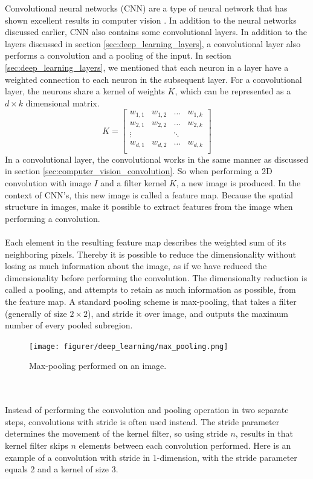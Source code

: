 \documentclass[11pt]{article}
\begin{document}
Convolutional neural networks (CNN) are a type of neural network that has shown excellent results in computer vision \cite{cnn_results}. In addition to the neural networks discussed earlier, CNN also
contains some convolutional layers.  In addition to the layers discussed in section \ref{sec:deep_learning_layers}, a convolutional layer also performs a convolution and a pooling of the input.  In section \ref{sec:deep_learning_layers}, we mentioned that each neuron in a layer have a weighted connection to each neuron in the subsequent layer. For a convolutional layer, the neurons share a kernel of weights $K$, which can be represented as a $d \times k$ dimensional matrix.
$$
K =
\begin{bmatrix}
    w_{1,1 } & w_{1, 2} & \hdots & w_{1, k} \\
    w_{2,1 } & w_{2, 2} & \hdots & w_{2, k} \\
    \vdots   &          & \ddots &          \\
    w_{d,1 } & w_{d, 2} & \hdots & w_{d, k} \\
\end{bmatrix}
$$
In a convolutional layer, the convolutional works in the same manner as discussed in section \ref{sec:computer_vision_convolution}. So when performing a 2D convolution with image $I$ and a filter kernel $K$, a new image is produced. In the context of CNN's, this new image is called a feature map. Because the spatial structure in images, make it possible to extract features from the image when performing a convolution.
\\ \\
Each element in the resulting feature map describes the weighted sum of its neighboring pixels. Thereby it is possible to reduce the dimensionality without losing as much information about the image, as if we have reduced the dimensionality before performing the convolution. The dimensionalty reduction is called a pooling, and attempts to retain as much information as possible, from the feature map. A standard pooling scheme is max-pooling, that takes a filter (generally of size $2 \times 2$), and stride it over image, and outputs the maximum number of every pooled subregion.

\begin{figure}[!h]
    \centering
    \texttt{[image: figurer/deep\_learning/max\_pooling.png]}
    \caption{Max-pooling performed on an image.}
    \label{fig:deep_learning_max_pooling}
\end{figure}
\\ \\
Instead of performing the convolution and pooling operation in two separate steps, convolutions with stride is often used instead. The stride parameter determines the movement of the kernel filter, so using stride $n$, results in that kernel filter skips $n$ elements between each convolution performed. Here is an example of a convolution with stride in 1-dimension, with the stride parameter equals 2 and a kernel of size 3.
\end{document}
